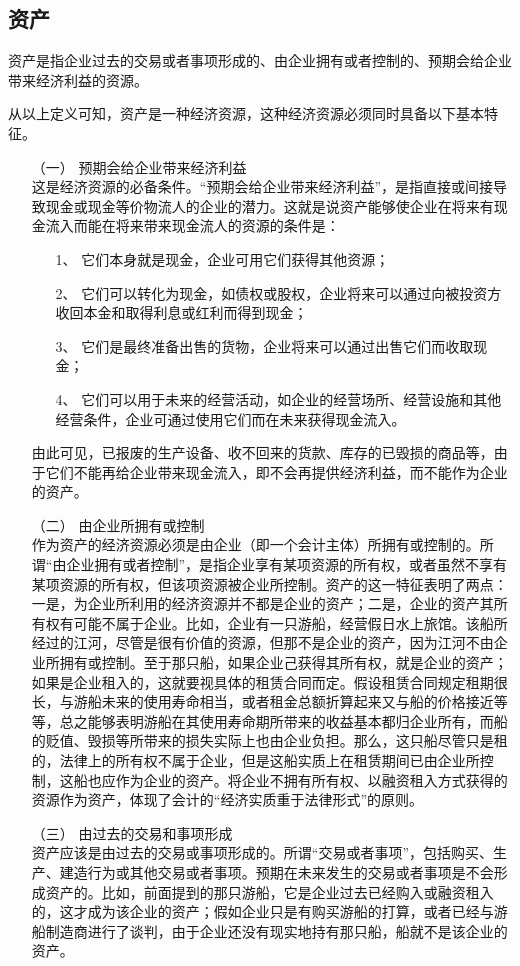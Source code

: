 		\subsection{资产}
			资产是指企业过去的交易或者事项形成的、由企业拥有或者控制的、预期会给企业带来经济利益的资源。

			从以上定义可知，资产是一种经济资源，这种经济资源必须同时具备以下基本特征。
			\begin{enumerate}
				\item[（一）] 预期会给企业带来经济利益 \\
					这是经济资源的必备条件。“预期会给企业带来经济利益”，是指直接或间接导致现金或现金等价物流人的企业的潜力。这就是说资产能够使企业在将来有现金流入而能在将来带来现金流人的资源的条件是：

					\begin{enumerate}
						\item[1、] 它们本身就是现金，企业可用它们获得其他资源；
						\item[2、] 它们可以转化为现金，如债权或股权，企业将来可以通过向被投资方收回本金和取得利息或红利而得到现金；
						\item[3、] 它们是最终准备出售的货物，企业将来可以通过出售它们而收取现金；
						\item[4、] 它们可以用于未来的经营活动，如企业的经营场所、经营设施和其他经营条件，企业可通过使用它们而在未来获得现金流入。
					\end{enumerate}

					由此可见，已报废的生产设备、收不回来的货款、库存的已毁损的商品等，由于它们不能再给企业带来现金流入，即不会再提供经济利益，而不能作为企业的资产。

				\item[（二）] 由企业所拥有或控制 \\
					作为资产的经济资源必须是由企业（即一个会计主体）所拥有或控制的。所谓“由企业拥有或者控制”，是指企业享有某项资源的所有权，或者虽然不享有某项资源的所有权，但该项资源被企业所控制。资产的这一特征表明了两点：一是，为企业所利用的经济资源并不都是企业的资产；二是，企业的资产其所有权有可能不属于企业。比如，企业有一只游船，经营假日水上旅馆。该船所经过的江河，尽管是很有价值的资源，但那不是企业的资产，因为江河不由企业所拥有或控制。至于那只船，如果企业己获得其所有权，就是企业的资产；如果是企业租入的，这就要视具体的租赁合同而定。假设租赁合同规定租期很长，与游船未来的使用寿命相当，或者租金总额折算起来又与船的价格接近等等，总之能够表明游船在其使用寿命期所带来的收益基本都归企业所有，而船的贬值、毁损等所带来的损失实际上也由企业负担。那么，这只船尽管只是租的，法律上的所有权不属于企业，但是这船实质上在租赁期间已由企业所控制，这船也应作为企业的资产。将企业不拥有所有权、以融资租入方式获得的资源作为资产，体现了会计的“经济实质重于法律形式”的原则。
				\item[（三）] 由过去的交易和事项形成 \\
					资产应该是由过去的交易或事项形成的。所谓“交易或者事项”，包括购买、生产、建造行为或其他交易或者事项。预期在未来发生的交易或者事项是不会形成资产的。比如，前面提到的那只游船，它是企业过去已经购入或融资租入的，这才成为该企业的资产；假如企业只是有购买游船的打算，或者已经与游船制造商进行了谈判，由于企业还没有现实地持有那只船，船就不是该企业的资产。
					

\end{enumerate}
